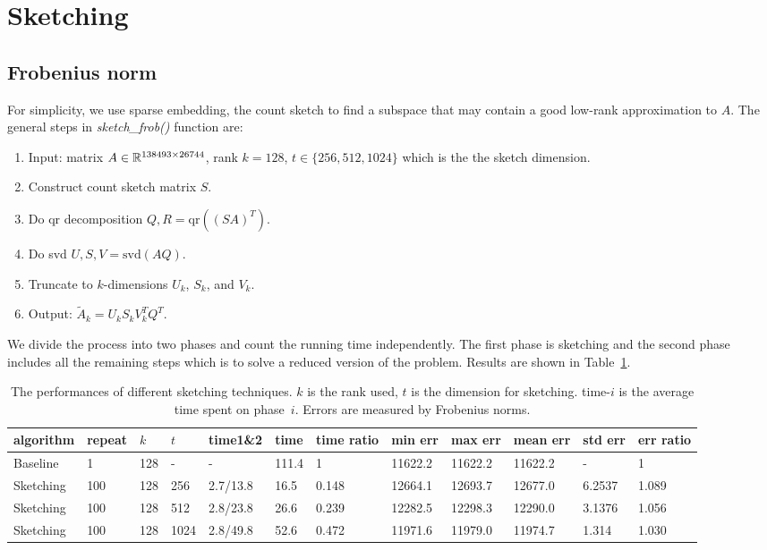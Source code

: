 \section{Sketching}

\subsection{Frobenius norm}
For simplicity, we use sparse embedding, \ie the count sketch
to find a subspace that may contain a good low-rank approximation to $A$.
The general steps in \textit{sketch\_frob()} function are:
\begin{enumerate}
    \item Input: matrix $A\in {\mathbb{R}}^{138493\times 26744}$,
        rank $k=128$,
        $t\in\{256, 512, 1024\}$ which is the the sketch dimension.
    \item Construct count sketch matrix $S$.
    \item Do qr decomposition $Q, R = \text{qr}((SA)^T)$.
    \item Do svd $U, S, V = \text{svd}(AQ)$.
    \item Truncate to $k$-dimensions $U_k$, $S_k$, and $V_k$.
    \item Output: $\tilde{A}_k = U_k S_k V_k^T Q^T$.
\end{enumerate}

We divide the process into two phases and count the running time independently.
The first phase is sketching and
the second phase includes all the remaining steps
which is to solve a reduced version of the problem.
Results are shown in Table~\ref{tab:frob}.

\begin{table}[htb]
  \setlength{\tabcolsep}{2.6pt}
  \caption{The performances of different sketching techniques.
  $k$ is the rank used, $t$ is the dimension for sketching.
  time-$i$ is the average time spent on phase~$i$.
  Errors are measured by Frobenius norms.
    }
  \label{tab:frob}
  \centering
  {\small
  \begin{tabular}{llllllllllll}
    \toprule
    algorithm & repeat & $k$ & $t$ & time1\&2 & time & time ratio & min err & max err & mean err & std err & err ratio \\
    \midrule
    Baseline & 1 & 128 & - & - & 111.4 & 1 & 11622.2 & 11622.2 & 11622.2 & - & 1 \\
    Sketching & 100 & 128 & 256 & 2.7/13.8 & 16.5 & 0.148 & 12664.1 & 12693.7 & 12677.0 & 6.2537 & 1.089 \\
    Sketching & 100 & 128 & 512 & 2.8/23.8 & 26.6 & 0.239 & 12282.5 & 12298.3 & 12290.0 & 3.1376 & 1.056 \\
    Sketching & 100 & 128 & 1024 & 2.8/49.8 & 52.6 & 0.472 & 11971.6 & 11979.0 & 11974.7 & 1.314 & 1.030 \\
    \bottomrule
  \end{tabular}
  }
\end{table}

